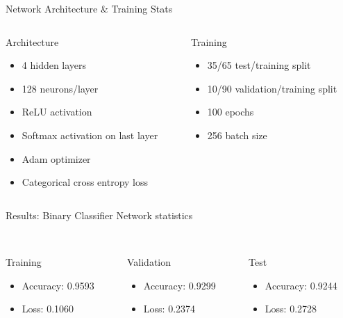 \documentclass[10pt,handout]{beamer}
\begin{document}
\begin{frame}{Network Architecture \& Training Stats}
\begin{columns}
\begin{column}{0.5\textwidth}
Architecture
\begin{itemize}
\item 4 hidden layers
\item 128 neurons/layer
\item ReLU activation
\item Softmax activation on last layer
\item Adam optimizer
\item Categorical cross entropy loss
\end{itemize}
\end{column}

\begin{column}{0.5\textwidth}
Training
\begin{itemize}
\item 35/65 test/training split
\item 10/90 validation/training split
\item 100 epochs
\item 256 batch size
\end{itemize}
\end{column}
\end{columns}
\end{frame}


\begin{frame}{Results: Binary Classifier}
Network statistics \\
\quad \quad \\
\begin{columns}
\begin{column}{0.3\textwidth}
Training
\begin{itemize}
\small
\item Accuracy: 0.9593
\item Loss: 0.1060
\end{itemize}
\end{column}
\begin{column}{0.3\textwidth}
Validation
\begin{itemize}
\small
\item Accuracy: 0.9299
\item Loss: 0.2374
\end{itemize}
\end{column}
\begin{column}{0.3\textwidth}
Test
\begin{itemize}
\small
\item Accuracy: 0.9244
\item Loss: 0.2728
\end{itemize}
\end{column}
\end{columns}
\end{frame}
\end{document}
